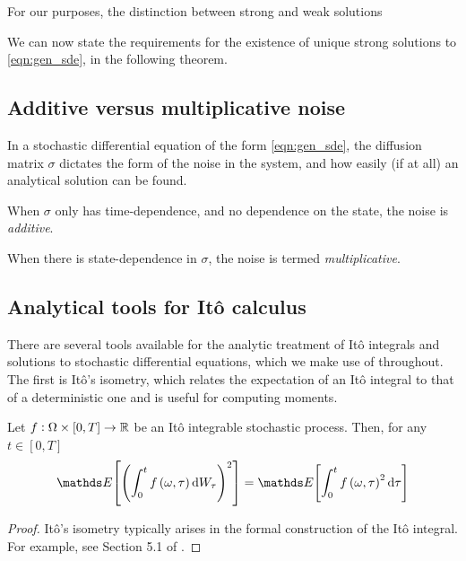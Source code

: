 For our purposes, the distinction between strong and weak solutions

We can now state the requirements for the existence of unique strong solutions to \eqref{eqn:gen_sde}, in the following theorem.

\begin{theorem}

\end{theorem}



\subsection{Additive versus multiplicative noise}
In a stochastic differential equation of the form \eqref{eqn:gen_sde}, the diffusion matrix \(\sigma\) dictates the form of the noise in the system, and how easily (if at all) an analytical solution can be found.

When \(\sigma\) only has time-dependence, and no dependence on the state, the noise is \emph{additive}.

When there is state-dependence in \(\sigma\), the noise is termed \emph{multiplicative}.


\subsection{Analytical tools for It\^o calculus}
There are several tools available for the analytic treatment of It\^o integrals and solutions to stochastic differential equations, which we make use of throughout.
The first is It\^o's isometry, which relates the expectation of an It\^o integral to that of a deterministic one and is useful for computing moments.
\begin{theorem}[It\^o's Isometry]\label{thm:ito_isom}
	Let \(f: \Omega \times [0,T] \to \mathbb{R}\) be an It\^o integrable stochastic process.
	Then, for any \(t \in [0,T]\)
	\[
		\avg{\left(\int_0^t{f\left(\omega, \tau\right)\dif W_\tau}\right)^2} = \avg{\int_0^t{f\left(\omega, \tau\right)^2\dif\tau}}
	\]
\end{theorem}
\begin{proof}
	It\^o's isometry typically arises in the formal construction of the It\^o integral.
	For example, see Section 5.1 of \citet{KallianpurSundar_2014_StochasticAnalysisDiffusion}.
\end{proof}

